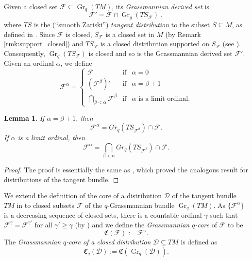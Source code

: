 \documentclass[12pt]{amsart}
\newtheorem{lem}[theorem]{Lemma}
\numberwithin{equation}{section}
{\theoremstyle{definition}
\newtheorem{remark}[theorem]{Remark}
}
\DeclareMathOperator{\Grass}{Gr}
\newcommand{\Gr}{\Grass}
\newcommand{\Coreof}{\mathfrak{C}}
\begin{document}
Given a closed set $\mathcal{F}\subseteq\Gr_q(TM)$, its \emph{Grassmannian derived set} is
$$\mathcal{F}'=\mathcal{F}\cap \Gr_q(TS_{\mathcal{F}})\;,$$
where $TS$ is the (``smooth Zariski'') \emph{tangent distribution} to the subset $S\subseteq M$, as defined in \cite[Definition 2.5]{DaMo21}. Since $\mathcal{F}$ is closed, $S_{\mathcal{F}}$ is a closed set in $M$ (by Remark \ref{rmk:support_closed}) and $TS_{\mathcal{F}}$ is a closed distribution supported on $S_{\mathcal{F}}$ (see \cite[Proposition 2.6]{DaMo21}).  Consequently, $\Gr_q(TS_{\mathcal{F}})$ is closed and so is the Grassmannian derived set $\mathcal{F}'$. Given an ordinal $\alpha$, we define
$$\mathcal{F}^\alpha=\left\{\begin{array}{ccl}\mathcal{F}&\textrm{if}&\alpha=0\\(\mathcal{F}^{\beta})'&\textrm{if}&\alpha=\beta+1\\
\displaystyle\bigcap_{\beta<\alpha}\mathcal{F}^\beta&\textrm{if}&\alpha\textrm{ is a limit ordinal.}\end{array}\right.$$

\begin{lem}\label{lem_backtotheroots}
    If $\alpha=\beta+1$, then
    $$\mathcal{F}^\alpha=Gr_q(TS_{\mathcal{F}^\beta})\cap\mathcal{F}.$$
    If $\alpha$ is a limit ordinal, then
    $$\mathcal{F}^\alpha=\bigcap_{\beta<\alpha}Gr_q(TS_{\mathcal{F}^\beta})\cap\mathcal{F}.$$
\end{lem}

\begin{proof}The proof is essentially the same as \cite[Lemma 2.5]{Tr22}, which proved the analogous result for distributions of the tangent bundle.\end{proof}

We extend the definition of the core of a distribution $\mathcal{D}$ of the tangent bundle $TM$ in \cite[Definition 2.10]{DaMo21} to closed subsets $\mathcal{F}$ of the $q$-Grassmannian bundle $\Gr_q(TM)$. As $\{\mathcal{F}^{\alpha}\}$ is a decreasing sequence of closed sets, there is a countable ordinal $\gamma$ such that $\mathcal{F}^\gamma=\mathcal{F}^{\gamma'}$ for all $\gamma'\geq \gamma$ (by \cite[Theorem 6.9]{Ke95}) and we define the \emph{Grassmannian $q$-core} of $\mathcal{F}$ to be 
$$\Coreof(\mathcal{F}):=\mathcal{F}^\gamma.$$ 
The \emph{Grassmannian $q$-core of a closed distribution} $\mathcal{D}\subseteq TM$ is defined as $$\Coreof_q(\mathcal{D}):=\Coreof(\Gr_q(\mathcal{D})).$$ 
\end{document}
